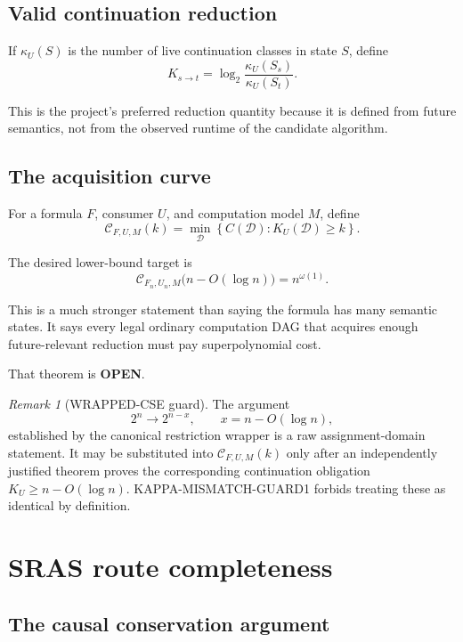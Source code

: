 \documentclass[11pt]{article}
\newcommand{\statusopen}{\textcolor{openstatus}{\textbf{OPEN}}}
\theoremstyle{plain}
\theoremstyle{definition}
\theoremstyle{remark}
\newtheorem{remark}[theorem]{Remark}
\begin{document}
\subsection{Valid continuation reduction}

If \(\kappa_U(S)\) is the number of live continuation classes in state \(S\),
define
\[
\boxed{
K_{s\to t}
=
\log_2
\frac{\kappa_U(S_s)}{\kappa_U(S_t)}.
}
\]

This is the project's preferred reduction quantity because it is defined from
future semantics, not from the observed runtime of the candidate algorithm.

\subsection{The acquisition curve}

For a formula \(F\), consumer \(U\), and computation model \(M\), define
\[
\boxed{
\mathcal C_{F,U,M}(k)
=
\min_{\mathcal D}
\left\{
C(\mathcal D):
K_U(\mathcal D)\ge k
\right\}.
}
\]

The desired lower-bound target is
\[
\boxed{
\mathcal C_{F_n,U_n,M}
\bigl(n-O(\log n)\bigr)
=
n^{\omega(1)}.
}
\]

This is a much stronger statement than saying the formula has many semantic
states.  It says every legal ordinary computation DAG that acquires enough
future-relevant reduction must pay superpolynomial cost.

That theorem is \statusopen.


\begin{remark}[WRAPPED-CSE guard]
The argument
\[
2^n\to2^{n-x},\qquad x=n-O(\log n),
\]
established by the canonical restriction wrapper is a raw assignment-domain
statement.  It may be substituted into
\(\mathcal C_{F,U,M}(k)\) only after an independently justified theorem proves
the corresponding continuation obligation
\(K_U\ge n-O(\log n)\).  KAPPA-MISMATCH-GUARD1 forbids treating these as
identical by definition.
\end{remark}



\section{SRAS route completeness}

\subsection{The causal conservation argument}
\end{document}
